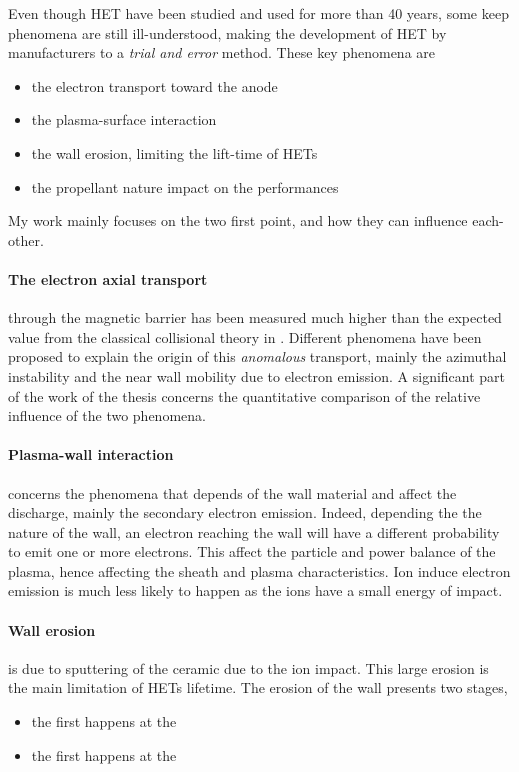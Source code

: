 Even though \ac{HET} have been studied and used for more than 40 years, some keep phenomena are still ill-understood, making the development of \ac{HET} by manufacturers to a \emph{ trial and error} method.
These key phenomena are
\begin{itemize}
  \item the electron transport toward the anode
  \item the plasma-surface interaction 
  \item the wall erosion, limiting the lift-time of \ac{HET}s
  \item the propellant nature impact on the performances
\end{itemize}

My work mainly focuses on the two first point, and how they can influence each-other.

\paragraph{The electron axial transport}  through the magnetic barrier has been measured much higher than the expected value from the classical collisional theory in \citet{meezan2001}.
Different phenomena have been proposed to explain the origin of this \emph{anomalous} transport, mainly the azimuthal instability and the near wall mobility due to electron emission.
A significant part of the work of the thesis concerns the quantitative comparison of the relative influence of the two phenomena.

\paragraph{Plasma-wall interaction} concerns the phenomena that depends of the wall material and affect the discharge, mainly the secondary electron emission.
Indeed, depending the the nature of the wall, an electron reaching the wall will have a different probability to emit one or more electrons.
This affect the particle and power balance of the plasma, hence affecting the sheath and plasma characteristics.
Ion induce electron emission is much less likely to happen as the ions have a small energy of impact.

\paragraph{Wall erosion} is due to sputtering of the ceramic due to the ion impact.
This large erosion is the main limitation of \ac{HET}s lifetime.
The erosion of the wall presents two stages,
\begin{itemize}
  \item the first happens at the 
  \item the first happens at the 
\end{itemize}




